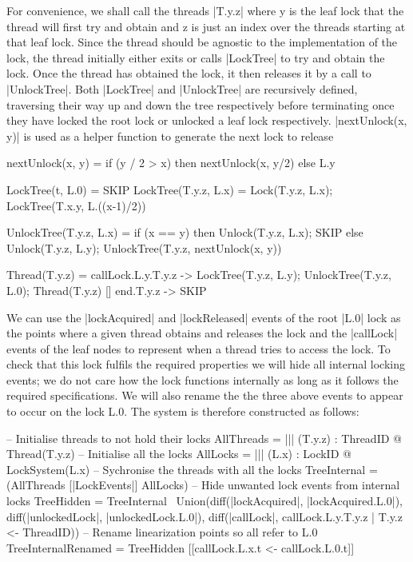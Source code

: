 For convenience, we shall call the threads |T.{y}.{z}| where y is the leaf lock that the thread will first try and obtain and z is just an index over the threads starting at that leaf lock. Since the thread should be agnostic to the implementation of the lock, the thread initially either exits or calls |LockTree| to try and obtain the lock. Once the thread has obtained the lock, it then releases it by a call to |UnlockTree|. Both |LockTree| and |UnlockTree| are recursively defined, traversing their way up and down the tree respectively before terminating once they have locked the root lock or unlocked a leaf lock respectively. 
|nextUnlock(x, y)| is used as a helper function to generate the next lock to release 

\begin{cspm}
  nextUnlock(x, y) = if (y / 2 > x) then nextUnlock(x, y/2) else L.y 

  LockTree(t, L.0) = SKIP
  LockTree(T.y.z, L.x) = Lock(T.y.z, L.x); LockTree(T.x.y, L.((x-1)/2))

  UnlockTree(T.y.z, L.x) = if (x == y) then Unlock(T.y.z, L.x); SKIP
                           else Unlock(T.y.z, L.y); 
                                UnlockTree(T.y.z, nextUnlock(x, y))

  Thread(T.y.z) = callLock.L.y.T.y.z -> LockTree(T.y.z, L.y); 
                                          UnlockTree(T.y.z, L.0); 
                                          Thread(T.y.z)
                 [] end.T.y.z -> SKIP
\end{cspm}

We can use the |lockAcquired| and |lockReleased| events of the root |L.0| lock as the points where a given thread obtains and releases the lock and the |callLock| events of the leaf nodes to represent when a thread tries to access the lock. To check that this lock fulfils the required properties we will hide all internal locking events; we do not care how the lock functions internally as long as it follows the required specifications. We will also rename the the three above events to appear to occur on the lock L.0. The system is therefore constructed as follows:

\begin{cspm}
  -- Initialise threads to not hold their locks
  AllThreads = ||| (T.y.z) : ThreadID @ Thread(T.y.z)
  -- Initialise all the locks
  AllLocks = ||| (L.x) : LockID @ LockSystem(L.x)
  -- Sychronise the threads with all the locks
  TreeInternal = (AllThreads [|LockEvents|] AllLocks)
  -- Hide unwanted lock events from internal locks
  TreeHidden = TreeInternal \ Union(diff({|lockAcquired|}, {|lockAcquired.L.0|}), 
                                     diff({|unlockedLock|}, {|unlockedLock.L.0|}),
                                     diff({|callLock|}, 
                                            {callLock.L.y.T.y.z | T.y.z <- ThreadID}))
  -- Rename linearization points so all refer to L.0
  TreeInternalRenamed = TreeHidden [[callLock.L.x.t <- callLock.L.0.t]]
\end{cspm}


